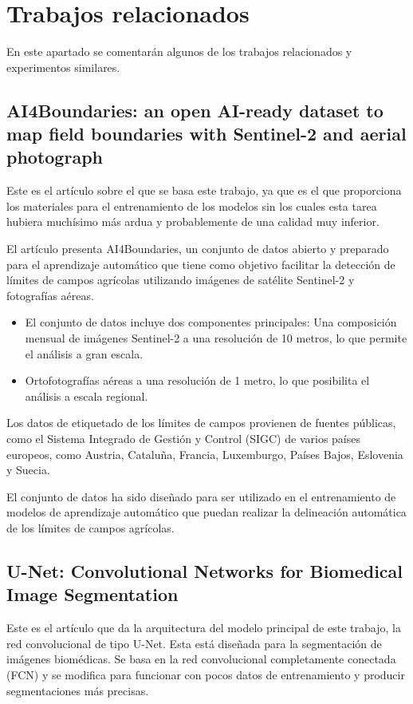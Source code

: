 \chapter{Trabajos relacionados}
En este apartado se comentarán algunos de los trabajos relacionados y experimentos similares.

\section{AI4Boundaries: an open AI-ready dataset to map field boundaries with Sentinel-2 and aerial photograph\cite{AI4boundaries}}

Este es el artículo sobre el que se basa este trabajo, ya que es el que proporciona los materiales para el entrenamiento de los modelos sin los cuales esta tarea hubiera muchísimo más ardua y probablemente de una calidad muy inferior.

El artículo presenta AI4Boundaries, un conjunto de datos abierto y preparado para el aprendizaje automático que tiene como objetivo facilitar la detección de límites de campos agrícolas utilizando imágenes de satélite Sentinel-2 y fotografías aéreas.
\begin{itemize}

	\item El conjunto de datos incluye dos componentes principales:
	Una composición mensual de imágenes Sentinel-2 a una resolución de 10 metros, lo que permite el análisis a gran escala.
	
	\item Ortofotografías aéreas a una resolución de 1 metro, lo que posibilita el análisis a escala regional.
\end{itemize}

Los datos de etiquetado de los límites de campos provienen de fuentes públicas, como el Sistema Integrado de Gestión y Control (SIGC) de varios países europeos, como Austria, Cataluña, Francia, Luxemburgo, Países Bajos, Eslovenia y Suecia.

El conjunto de datos ha sido diseñado para ser utilizado en el entrenamiento de modelos de aprendizaje automático que puedan realizar la delineación automática de los límites de campos agrícolas.

\section{U-Net: Convolutional Networks for Biomedical Image Segmentation\cite{Unet}}

Este es el artículo que da la arquitectura del modelo principal de este trabajo, la red convolucional de tipo U-Net. Esta está diseñada para la segmentación de imágenes biomédicas. Se basa en la red convolucional completamente conectada (FCN) y se modifica para funcionar con pocos datos de entrenamiento y producir segmentaciones más precisas.

